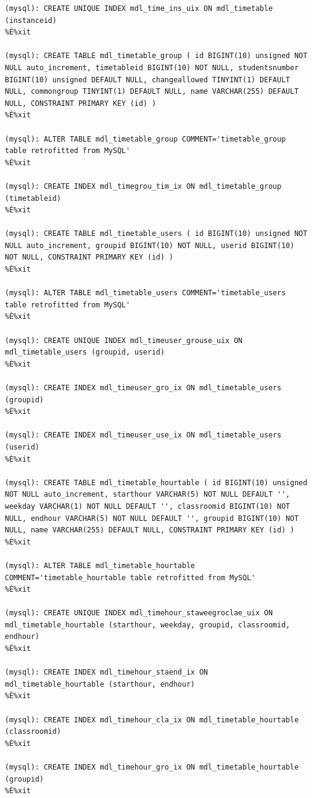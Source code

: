 \documentclass[a4paper]{report}  %
\begin{document}
\begin{lstlisting}[style=SQL, caption=Resultat de la insta\l.lació del Block dins al sistema Moodle,escapechar=\%]
(mysql): CREATE UNIQUE INDEX mdl_time_ins_uix ON mdl_timetable (instanceid)
%È%xit

(mysql): CREATE TABLE mdl_timetable_group ( id BIGINT(10) unsigned NOT NULL auto_increment, timetableid BIGINT(10) NOT NULL, studentsnumber BIGINT(10) unsigned DEFAULT NULL, changeallowed TINYINT(1) DEFAULT NULL, commongroup TINYINT(1) DEFAULT NULL, name VARCHAR(255) DEFAULT NULL, CONSTRAINT PRIMARY KEY (id) )
%È%xit

(mysql): ALTER TABLE mdl_timetable_group COMMENT='timetable_group table retrofitted from MySQL'
%È%xit

(mysql): CREATE INDEX mdl_timegrou_tim_ix ON mdl_timetable_group (timetableid)
%È%xit

(mysql): CREATE TABLE mdl_timetable_users ( id BIGINT(10) unsigned NOT NULL auto_increment, groupid BIGINT(10) NOT NULL, userid BIGINT(10) NOT NULL, CONSTRAINT PRIMARY KEY (id) )
%È%xit

(mysql): ALTER TABLE mdl_timetable_users COMMENT='timetable_users table retrofitted from MySQL'
%È%xit

(mysql): CREATE UNIQUE INDEX mdl_timeuser_grouse_uix ON mdl_timetable_users (groupid, userid)
%È%xit

(mysql): CREATE INDEX mdl_timeuser_gro_ix ON mdl_timetable_users (groupid)
%È%xit

(mysql): CREATE INDEX mdl_timeuser_use_ix ON mdl_timetable_users (userid)
%È%xit

(mysql): CREATE TABLE mdl_timetable_hourtable ( id BIGINT(10) unsigned NOT NULL auto_increment, starthour VARCHAR(5) NOT NULL DEFAULT '', weekday VARCHAR(1) NOT NULL DEFAULT '', classroomid BIGINT(10) NOT NULL, endhour VARCHAR(5) NOT NULL DEFAULT '', groupid BIGINT(10) NOT NULL, name VARCHAR(255) DEFAULT NULL, CONSTRAINT PRIMARY KEY (id) )
%È%xit

(mysql): ALTER TABLE mdl_timetable_hourtable COMMENT='timetable_hourtable table retrofitted from MySQL'
%È%xit

(mysql): CREATE UNIQUE INDEX mdl_timehour_staweegroclae_uix ON mdl_timetable_hourtable (starthour, weekday, groupid, classroomid, endhour)
%È%xit

(mysql): CREATE INDEX mdl_timehour_staend_ix ON mdl_timetable_hourtable (starthour, endhour)
%È%xit

(mysql): CREATE INDEX mdl_timehour_cla_ix ON mdl_timetable_hourtable (classroomid)
%È%xit

(mysql): CREATE INDEX mdl_timehour_gro_ix ON mdl_timetable_hourtable (groupid)
%È%xit


\end{lstlisting}
\end{document}
